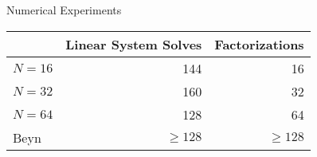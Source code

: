 \documentclass[mathserif, xcolor=table]{beamer}
\begin{document}
\begin{frame}{Numerical Experiments}



	\begin{table}
		\small
		\centering
		\begin{tabular}{lrr}
			\toprule
			\hspace{11em} & Linear System Solves & Factorizations \\
			\midrule
			\( N=16 \) & 144 & 16 \\
			\( N=32 \) & 160 & 32 \\
			\( N=64 \) & 128 & 64 \\
			\rowcolor{blue!10}
			Beyn       & \(\ge128\) & \(\ge128\) \\
			\bottomrule
		\end{tabular}
	\end{table}
\end{frame}

\end{document}
